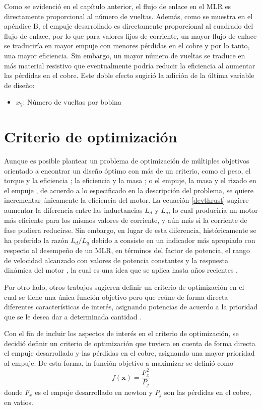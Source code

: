 Como se evidenció en el capítulo anterior, el flujo de enlace en el MLR es directamente proporcional al número de vueltas. Además, como se muestra en el apéndice B, el empuje desarrollado es directamente proporcional al cuadrado del flujo de enlace, por lo que para valores fijos de corriente, un mayor flujo de enlace se traduciría en mayor empuje con menores pérdidas en el cobre y por lo tanto, una mayor eficiencia. Sin embargo, un mayor número de vueltas se traduce en más material resistivo que eventualmente podría reducir la eficiencia al aumentar las pérdidas en el cobre. Este doble efecto sugirió la adición de la última variable de diseño:
\begin{itemize}
\item $x_7$: Número de vueltas por bobina
\end{itemize}

\section{Criterio de optimización}
Aunque es posible plantear un problema de optimización de múltiples objetivos orientado a encontrar un diseño óptimo con más de un criterio, como el peso, el torque y la eficiencia \cite{duan2013}; la eficiencia y la masa \cite{dubas2008}; o el empuje, la masa y el rizado en el empuje \cite{vaezzadeh2006}, de acuerdo a lo especificado en la descripción del problema, se quiere incrementar únicamente la eficiencia del motor. La ecuación \ref{devthrust} sugiere aumentar la diferencia entre las inductancias $L_d$ y $L_q$, lo cual produciría un motor más eficiente para los mismos valores de corriente, y aún más si la corriente de fase pudiera reducirse. Sin embargo, en lugar de esta diferencia, históricamente se ha preferido la razón $L_d/L_q$ debido a consiste en un indicador más apropiado con respecto al desempeño de un MLR, en términos del factor de potencia, el rango de velocidad alcanzado con valores de potencia constantes y la respuesta dinámica del motor \cite{staton1993}, la cual es una idea que se aplica hasta años recientes \cite{boldea2013}.

Por otro lado, otros trabajos sugieren definir un criterio de optimización en el cual se tiene una única función objetivo pero que reúne de forma directa diferentes características de interés, asignando potencias de acuerdo a la prioridad que se le desea dar a determinada cantidad \cite{dong2014,shiri2012}.

Con el fin de incluir los aspectos de interés en el criterio de optimización, se decidió definir un criterio de optimización que tuviera en cuenta de forma directa el empuje desarrollado y las pérdidas en el cobre, asignando una mayor prioridad al empuje. De esta forma, la función objetivo a maximizar se definió como
\begin{equation*}
f(\mathbf{x}) = \frac{F_x^2}{P_j}
\end{equation*}
donde $F_x$ es el empuje desarrollado en newton y $P_j$ son las pérdidas en el cobre, en vatios.

